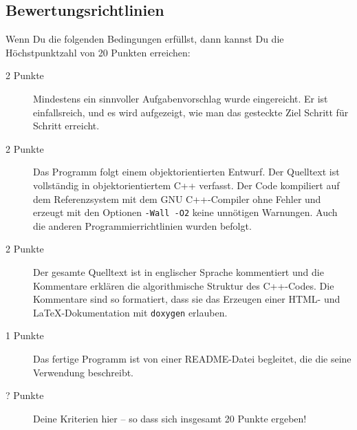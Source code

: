 \documentclass[10pt]{article}
\begin{document}
\begin{multicols}{2}
\section{Bewertungsrichtlinien}

Wenn Du die folgenden Bedingungen erfüllst, dann kannst Du die
Höchstpunktzahl von 20 Punkten erreichen:

\begin{description}
\item[2 Punkte]
        Mindestens ein sinnvoller Aufgabenvorschlag wurde eingereicht.
        Er ist einfallsreich, und es wird aufgezeigt, wie man das gesteckte Ziel
        Schritt für Schritt erreicht.
\item[2 Punkte]
        Das Programm folgt einem objektorientierten Entwurf.
        Der Quelltext ist vollständig in objektorientiertem C++ verfasst.
        Der Code kompiliert auf dem Referenzsystem mit dem GNU C++-Compiler
        ohne Fehler und erzeugt mit den Optionen \texttt{-Wall -O2} keine
        unnötigen Warnungen.
        Auch die anderen Programmierrichtlinien wurden befolgt.
\item[2 Punkte]
        Der gesamte Quelltext ist in englischer Sprache kommentiert und
        die Kommentare erklären die algorithmische Struktur des C++-Codes.
        Die Kommentare sind so formatiert, dass sie das Erzeugen einer
        HTML- und \LaTeX-Dokumentation mit \texttt{doxygen} erlauben.
\item[1 Punkte]
        Das fertige Programm ist von einer README-Datei begleitet, die die
        seine Verwendung beschreibt.
\item[? Punkte]
        Deine Kriterien hier -- so dass sich insgesamt 20 Punkte ergeben!
\end{description}




\nocite{*}


\end{multicols}
\end{document}
